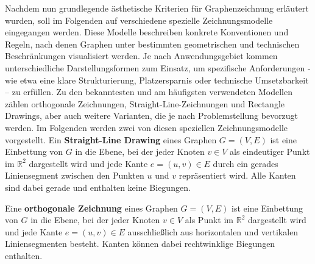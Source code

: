 \documentclass[bachelor, german]{algothesis}
\begin{document}
Nachdem nun grundlegende ästhetische Kriterien für Graphenzeichnung erläutert wurden, soll im Folgenden auf verschiedene spezielle Zeichnungsmodelle eingegangen werden. Diese Modelle beschreiben konkrete Konventionen und Regeln, nach denen Graphen unter bestimmten geometrischen und technischen Beschränkungen visualisiert werden.\newline
Je nach Anwendungsgebiet kommen unterschiedliche Darstellungsformen zum Einsatz, um spezifische Anforderungen - wie etwa eine klare Strukturierung, Platzersparnis oder technische Umsetzbarkeit – zu erfüllen. Zu den bekanntesten und am häufigsten verwendeten Modellen zählen orthogonale Zeichnungen, Straight-Line-Zeichnungen und Rectangle Drawings, aber auch weitere Varianten, die je nach Problemstellung bevorzugt werden.
Im Folgenden werden zwei von diesen speziellen Zeichnungsmodelle vorgestellt\cite{Handbook}.\newline \newline
Ein \textbf{Straight-Line Drawing}  eines Graphen $G = (V,E)$ ist eine Einbettung von $G$ in die Ebene, bei der jeder Knoten $v \in V$ als eindeutiger Punkt im $\mathbb{R}^2$ dargestellt wird und jede Kante $e = (u,v) \in E$ durch ein gerades Liniensegment zwischen den Punkten $u$ und $v$ repräsentiert wird. Alle Kanten sind dabei gerade und enthalten keine Biegungen.\newline

Eine \textbf{orthogonale Zeichnung} eines Graphen $G = (V,E)$ ist eine Einbettung von $G$ in die Ebene, bei der jeder Knoten $v \in V$ als Punkt im $\mathbb{R}^2$ dargestellt wird und jede Kante $e = (u,v) \in E$ ausschließlich aus horizontalen und vertikalen Liniensegmenten besteht. Kanten können dabei rechtwinklige Biegungen enthalten.\newline
\end{document}
